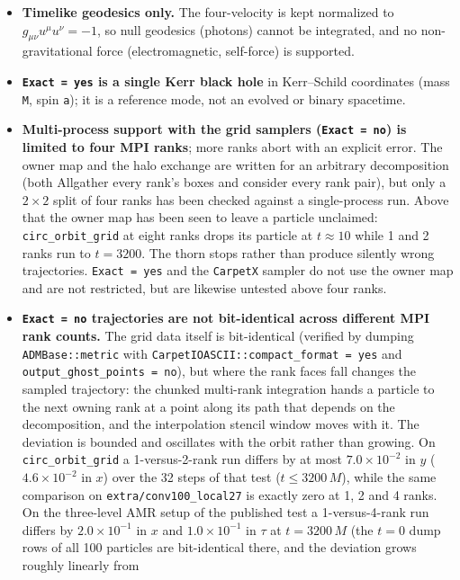 \documentclass{article}
\begin{document}
\begin{itemize}
\item \textbf{Timelike geodesics only.}  The four-velocity is kept
  normalized to $g_{\mu\nu}u^\mu u^\nu = -1$, so null geodesics
  (photons) cannot be integrated, and no non-gravitational force
  (electromagnetic, self-force) is supported.
\item \textbf{\texttt{Exact = yes} is a single Kerr black hole} in
  Kerr--Schild coordinates (mass \texttt{M}, spin \texttt{a}); it is a
  reference mode, not an evolved or binary spacetime.
\item \textbf{Multi-process support with the grid samplers
  (\texttt{Exact = no}) is limited to four MPI ranks}; more ranks abort
  with an explicit error.  The owner map and the halo exchange are
  written for an arbitrary decomposition (both Allgather every rank's
  boxes and consider every rank pair), but only a $2 \times 2$ split of
  four ranks has been checked against a single-process run.  Above that
  the owner map has been seen to leave a particle unclaimed:
  \texttt{circ\_orbit\_grid} at eight ranks drops its particle at
  $t \approx 10$ while 1 and 2 ranks run to $t = 3200$.  The thorn stops
  rather than produce silently wrong trajectories.
  \texttt{Exact = yes} and the \texttt{CarpetX} sampler do not use the
  owner map and are not restricted, but are likewise untested above four
  ranks.
\item \textbf{\texttt{Exact = no} trajectories are not bit-identical
  across different MPI rank counts.}  The grid data itself is
  bit-identical (verified by dumping \texttt{ADMBase::metric} with
  \texttt{CarpetIOASCII::compact\_format = yes} and
  \texttt{output\_ghost\_points = no}), but where the rank faces fall
  changes the sampled trajectory: the chunked multi-rank integration
  hands a particle to the next owning rank at a point along its path
  that depends on the decomposition, and the interpolation stencil
  window moves with it.  The deviation is bounded and oscillates with
  the orbit rather than growing.  On \texttt{circ\_orbit\_grid} a
  1-versus-2-rank run differs by at most $7.0\times10^{-2}$ in $y$
  ($4.6\times10^{-2}$ in $x$) over the 32 steps of that test
  ($t \le 3200\,M$), while the same comparison on
  \texttt{extra/conv100\_local27} is exactly zero at 1, 2 and 4 ranks.
  On the three-level AMR setup of the published test a 1-versus-4-rank
  run differs by $2.0\times10^{-1}$ in $x$ and $1.0\times10^{-1}$ in
  $\tau$ at $t = 3200\,M$ (the $t = 0$ dump rows of all 100 particles are
  bit-identical there, and the deviation grows roughly linearly from

\end{itemize}
\end{document}
